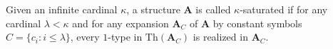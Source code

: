 Given an infinite cardinal $\kappa$, a structure $\mathbf{A}$ is called $\kappa$-saturated if for any cardinal $\lambda < \kappa$ and for any expansion $\mathbf{A}_C$ of $\mathbf{A}$ by constant symbols $C = \{c_i : i \leq \lambda\}$, every $1$-type in $\text{Th}(\mathbf{A}_C)$ is realized in $\mathbf{A}_C$.
